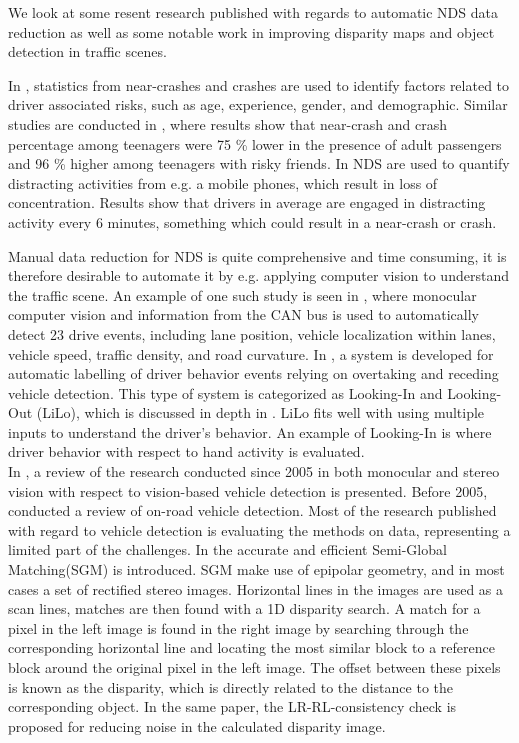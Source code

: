 We look at some resent research published with regards to automatic NDS data reduction as well as some notable work in improving disparity maps and object detection in traffic scenes. 

In \cite{Guo20133}, statistics from near-crashes and crashes are used to identify factors related to driver associated risks, such as age, experience, gender, and demographic. Similar studies are conducted in \cite{SimonsMorton2011587}, where results show that near-crash and crash percentage among teenagers were 75 \% lower in the presence of adult passengers and 96 \% higher among teenagers with risky friends. In \cite{mcevoy2006impact} NDS are used to quantify distracting activities from e.g. a mobile phones, which result in loss of concentration. Results show that drivers in average are engaged in distracting activity every 6 minutes, something which could result in a near-crash or crash.

Manual data reduction for NDS is quite comprehensive and time consuming, it is therefore desirable to automate it by e.g. applying computer vision to understand the traffic scene. An example of one such study is seen in \cite{raviLaneSemantics}, where monocular computer vision and information from the CAN bus is used to automatically detect 23 drive events, including lane position, vehicle localization within lanes, vehicle speed, traffic density, and road curvature. In \cite{raviOvertaking}, a system is developed for automatic labelling of driver behavior events relying on overtaking and receding vehicle detection. This type of system is categorized as Looking-In and Looking-Out (LiLo), which is discussed in depth in \cite{trivedi2007looking}. LiLo fits well with using multiple inputs to understand the driver's behavior. An example of Looking-In is \cite{ohn2013driver} where driver behavior with respect to hand activity is evaluated.\\

In \cite{SivaramanSurvey}, a review of the research conducted since 2005 in both monocular and stereo vision with respect to vision-based vehicle detection is presented. Before 2005, \cite{bebisReview} conducted a review of on-road vehicle detection. Most of the research published with regard to vehicle detection is evaluating the methods on data, representing a limited part of the challenges. In \cite{HirschmullerRLandSGBM} the accurate and efficient Semi-Global Matching(SGM) is introduced. SGM make use of epipolar geometry, and in most cases a set of rectified stereo images. Horizontal lines in the images are used as a scan lines, matches are then found with a 1D disparity search. A match for a pixel in the left image is found in the right image by searching through the corresponding horizontal line and locating the most similar block to a reference block around the original pixel in the left image. The offset between these pixels is known as the disparity, which is directly related to the distance to the corresponding object. In the same paper, the LR-RL-consistency check is proposed for reducing noise in the calculated disparity image. 

